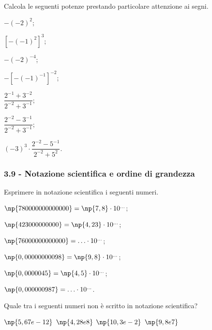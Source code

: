 \begin{esercizio}
 \label{ese:3.60}
Calcola le seguenti potenze prestando particolare attenzione ai segni.
\begin{multicols}{3}
\begin{enumeratea}
 \spazielenx
 \item $-(-2)^2$;
 \item $[-(-1)^{2}]^3$;
 \item $-(-2)^{-4}$;
 \item $-[-(-1)^{-1}]^{-2}$;
 \item $\dfrac{2^{-1}+3^{-2}}{2^{-2}+3^{-1}}$;
 \item $\dfrac{2^{-2}-3^{-1}}{2^{-2}+3^{-1}}$;
 \item $(-3)^3\cdot\dfrac{2^{-2}-5^{-1}}{2^{-2}+5^2}$.
\end{enumeratea}
\end{multicols}
\end{esercizio}

\subsubsection*{3.9 - Notazione scientifica e ordine di grandezza}

\begin{esercizio}
 \label{ese:3.61}
Esprimere in notazione scientifica i seguenti numeri.
\begin{multicols}{2}
\begin{enumeratea}
\item $\np{780000000000000}=\np{7,8}\cdot10^{\ldots}$;
\item $\np{423000000000}=\np{4,23}\cdot10^{\ldots}$;
\item $\np{76000000000000}= \ldots \cdot 10^{\ldots}$;
\item $\np{0,00000000098}=\np{9,8}\cdot10^{\ldots}$;
\item $\np{0,0000045}=\np{4,5}\cdot10^{\ldots}$;
\item $\np{0,000000987}= \ldots \cdot 10^{\ldots}$.
\end{enumeratea}
\end{multicols}
\end{esercizio}

\begin{esercizio}
 \label{ese:3.62}
Quale tra i seguenti numeri non è scritto in notazione scientifica?

\boxA\quad$\np{5,67e-12}$\qquad
\boxB\quad$\np{4,28e8}$\qquad
\boxC\quad$\np{10,3e-2}$\qquad
\boxD\quad$\np{9,8e7}$\qquad
\end{esercizio}

